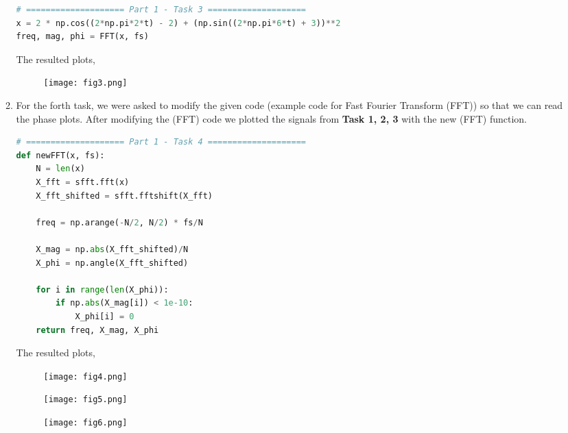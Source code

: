 \documentclass[12pt,a4paper]{article}
\begin{document}
\begin{itemize}
\begin{enumerate}
\begin{lstlisting}[language=Python, caption={Task 2, Part 1}, label={lst:code}, mathescape=true, breaklines=true]
# ==================== Part 1 - Task 3 ====================
x = 2 * np.cos((2*np.pi*2*t) - 2) + (np.sin((2*np.pi*6*t) + 3))**2
freq, mag, phi = FFT(x, fs)
\end{lstlisting}

The resulted plots,

\begin{figure}[h]
    \centering
    \texttt{[image: fig3.png]}
\end{figure}\textbf{}
\clearpage

    \item
    For the forth task, we were asked to modify the given code (example code for Fast Fourier Transform (FFT)) so that we can read the phase plots. After modifying the (FFT) code we plotted the signals from \textbf{Task 1, 2, 3} with the new (FFT) function.\\

\begin{lstlisting}[language=Python, caption={Task 2, Part 1}, label={lst:code}, mathescape=true, breaklines=true]
# ==================== Part 1 - Task 4 ====================
def newFFT(x, fs):
    N = len(x)
    X_fft = sfft.fft(x)
    X_fft_shifted = sfft.fftshift(X_fft)
    
    freq = np.arange(-N/2, N/2) * fs/N
    
    X_mag = np.abs(X_fft_shifted)/N
    X_phi = np.angle(X_fft_shifted)
    
    for i in range(len(X_phi)):
        if np.abs(X_mag[i]) < 1e-10:
            X_phi[i] = 0
    return freq, X_mag, X_phi
\end{lstlisting}

The resulted plots,
    
\begin{figure}[h]
    \centering
    \texttt{[image: fig4.png]}
\end{figure}\textbf{}
\clearpage

\begin{figure}[h]
    \centering
    \texttt{[image: fig5.png]}
\end{figure}\textbf{}

\begin{figure}[h]
    \centering
    \texttt{[image: fig6.png]}
\end{figure}\textbf{}
\clearpage


\end{enumerate}
\end{itemize}
\end{document}
